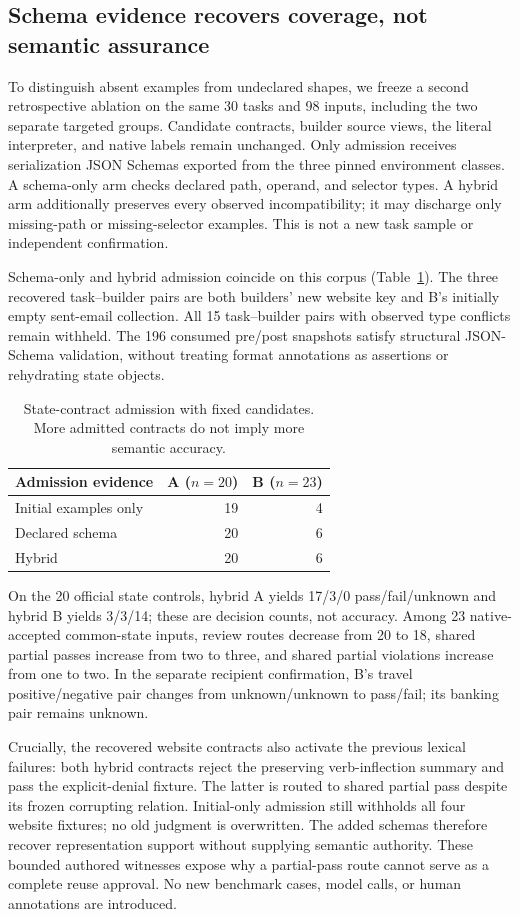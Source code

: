 \subsection{Schema evidence recovers coverage, not semantic assurance}
\label{sec:schema-admission}
To distinguish absent examples from undeclared shapes, we freeze a second retrospective ablation on the same 30 tasks and 98 inputs, including the two separate targeted groups. Candidate contracts, builder source views, the literal interpreter, and native labels remain unchanged. Only admission receives serialization JSON Schemas exported from the three pinned environment classes. A schema-only arm checks declared path, operand, and selector types. A hybrid arm additionally preserves every observed incompatibility; it may discharge only missing-path or missing-selector examples. This is not a new task sample or independent confirmation.

Schema-only and hybrid admission coincide on this corpus (Table~\ref{tab:schema-admission}). The three recovered task--builder pairs are both builders' new website key and B's initially empty sent-email collection. All 15 task--builder pairs with observed type conflicts remain withheld. The 196 consumed pre/post snapshots satisfy structural JSON-Schema validation, without treating format annotations as assertions or rehydrating state objects.

\begin{table}[t]
\centering\small
\caption{State-contract admission with fixed candidates. More admitted contracts do not imply more semantic accuracy.}
\label{tab:schema-admission}
\begin{tabular}{@{}lrr@{}}
\toprule
Admission evidence & A ($n=20$) & B ($n=23$) \\
\midrule
Initial examples only & 19 & 4 \\
Declared schema & 20 & 6 \\
Hybrid & 20 & 6 \\
\bottomrule
\end{tabular}
\end{table}

On the 20 official state controls, hybrid A yields 17/3/0 pass/fail/unknown and hybrid B yields 3/3/14; these are decision counts, not accuracy. Among 23 native-accepted common-state inputs, review routes decrease from 20 to 18, shared partial passes increase from two to three, and shared partial violations increase from one to two. In the separate recipient confirmation, B's travel positive/negative pair changes from unknown/unknown to pass/fail; its banking pair remains unknown.

Crucially, the recovered website contracts also activate the previous lexical failures: both hybrid contracts reject the preserving verb-inflection summary and pass the explicit-denial fixture. The latter is routed to shared partial pass despite its frozen corrupting relation. Initial-only admission still withholds all four website fixtures; no old judgment is overwritten. The added schemas therefore recover representation support without supplying semantic authority. These bounded authored witnesses expose why a partial-pass route cannot serve as a complete reuse approval. No new benchmark cases, model calls, or human annotations are introduced.
